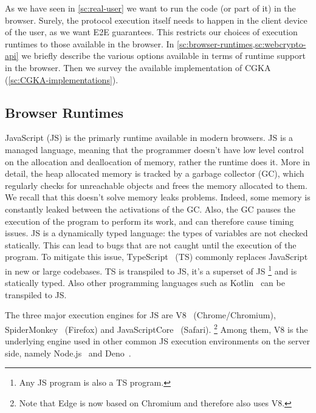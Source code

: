 As we have seen in \cref{sc:real-user} we want to
run the code (or part of it) in the browser.
Surely, the protocol execution itself needs to happen
in the client device of the user, as we want E2E guarantees.
This restricts our choices of execution runtimes to
those available in the browser. In \cref{sc:browser-runtimes,sc:webcrypto-api}
we briefly describe the various options available in terms of runtime
support in the browser.
Then we survey the available implementation of CGKA (\cref{sc:CGKA-implementations}).


\subsection{Browser Runtimes}\label{sc:browser-runtimes}

JavaScript (JS) is the primarly runtime available in modern browsers.
JS is a managed language, meaning that the programmer
doesn't have low level control on the allocation and
deallocation of memory, rather the runtime does it.
More in detail, the heap allocated memory
is tracked by a garbage collector (GC), which regularly
checks for unreachable objects and frees the memory allocated
to them. We recall that this doesn't solve memory leaks
problems. Indeed, some memory is constantly leaked
between the activations of the GC. Also, the GC
pauses the execution of the program to perform its work,
and can therefore cause timing issues. JS is a dynamically
typed language: the types of variables are not checked
statically. This can lead to bugs that are not caught
until the execution of the program.
To mitigate this issue, TypeScript~\cite{bierman2014understanding} (TS)
commonly replaces JavaScript in new or large codebases.
TS is transpiled to JS, it's a superset of JS
\footnote{Any JS program is also a TS program.}
and is statically typed.
Also other programming languages such as
Kotlin~\cite{KotlinToJs} can be transpiled to JS.

The three major execution engines for JS are V8~\cite{V8} (Chrome/Chromium),
SpiderMonkey~\cite{SpiderMonkey} (Firefox) and JavaScriptCore~\cite{JavaScriptCore} (Safari).
\footnote{Note that Edge is now based on Chromium and therefore
also uses V8.}
Among them, V8 is the underlying engine used in other
common JS execution environments on the server side, 
namely Node.js~\cite{NodeJS} and Deno~\cite{Deno}.


